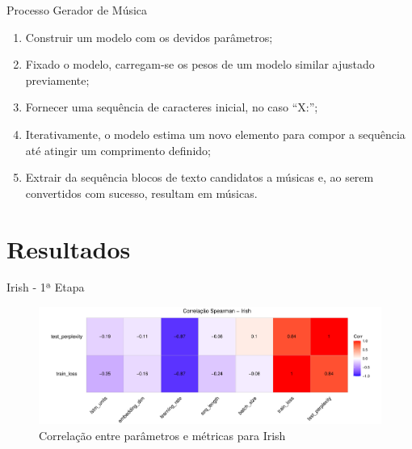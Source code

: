 \documentclass[xcolor=table]{beamer}
\begin{document}
    \begin{frame}{Processo Gerador de Música}
        \begin{enumerate}
            \justifying
            \item Construir um modelo com os devidos parâmetros; 
            \item Fixado o modelo, carregam-se os pesos de um modelo similar ajustado previamente;
            \item Fornecer uma sequência de caracteres inicial, no caso ``X:'';
            \item Iterativamente, o modelo estima um novo elemento para compor a sequência até atingir um comprimento definido;
            \item Extrair da sequência blocos de texto candidatos a músicas e, ao serem convertidos com sucesso, resultam em músicas.
        \end{enumerate}
    \end{frame}



\section{Resultados}
    \begin{frame}{Irish - 1ª Etapa}
        \begin{figure}
            \includegraphics[scale=0.38]{figuras/irish_tanh_corr.pdf}
            \caption{Correlação entre parâmetros e métricas para Irish}
        \end{figure}
    \end{frame}
\end{document}
